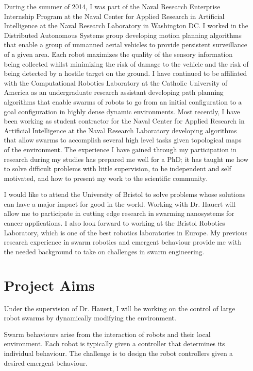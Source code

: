 \documentclass{article}
\begin{document}
During the summer of 2014, I was part of the Naval Research Enterprise
Internship Program at the Naval Center for Applied Research in Artificial
Intelligence at the Naval Research Laboratory in Washington DC. I worked in the
Distributed Autonomous Systems group developing motion planning algorithms that
enable a group of unmanned aerial vehicles to provide persistent surveillance
of a given area. Each robot maximizes the quality of the sensory information
being collected whilst minimizing the risk of damage to the vehicle and the
risk of being detected by a hostile target on the ground. I have continued to
be affiliated with the Computational Robotics Laboratory at the Catholic
University of America as an undergraduate research assistant developing path
planning algorithms that enable swarms of robots to go from an initial
configuration to a goal configuration in highly dense dynamic environments.
Most recently, I have been working as student contractor for the Naval Center
for Applied Research in Artificial Intelligence at the Naval Research
Laboratory developing algorithms that allow swarms to accomplish several high
level tasks given topological maps of the environment. The experience I have
gained through my participation in research during my studies has prepared me
well for a PhD; it has taught me how to solve difficult problems with little
supervision, to be independent and self motivated, and how to present my work
to the scientific community.

I would like to attend the University of Bristol to solve problems whose
solutions can have a major impact for good in the world. Working with Dr.
Hauert will allow me to participate in cutting edge research in swarming
nanosystems for cancer applications. I also look forward to working at the
Bristol Robotics Laboratory, which is one of the best robotics laboratories in
Europe. My previous research experience in swarm robotics and emergent
behaviour provide me with the needed background to take on challenges in swarm
engineering.


\section{Project Aims}

Under the supervision of Dr. Hauert, I will be working on the control of large
robot swarms by dynamically modifying the environment.

Swarm behaviours arise from the interaction of robots and their local
environment. Each robot is typically given a controller that determines its
individual behaviour. The challenge is to design the robot controllers given a
desired emergent behaviour.
\end{document}
